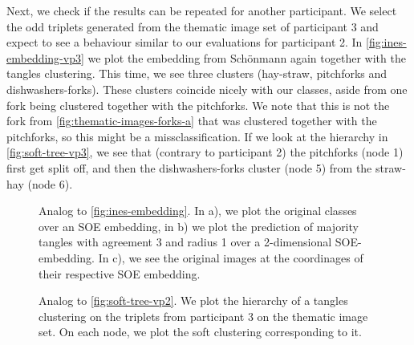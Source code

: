 Next, we check if the results can be repeated for another participant. 
We select the odd triplets generated from the thematic image set of participant 3 and expect to see a behaviour similar to our evaluations for participant 2. 
In \autoref{fig:ines-embedding-vp3} we plot the embedding
from Schönmann again together with the tangles clustering. This time, we see three clusters (hay-straw, pitchforks and dishwashers-forks). These clusters coincide nicely
with our classes, aside from one fork being clustered together with the pitchforks. We note that this is not the fork from \autoref{fig:thematic-images-forks-a} that was clustered together 
with the pitchforks, so this might be a missclassification. 
If we look at the hierarchy in \autoref{fig:soft-tree-vp3}, we see that (contrary to participant 2) the pitchforks (node 1) first get split off, 
and then the dishwashers-forks cluster (node 5) from the straw-hay (node 6).

\onecolumn
\begin{figure}[ht]
    \centering
    \hfill
    \caption{
        Analog to \autoref{fig:ines-embedding}. In a), we plot the original classes over an SOE embedding, in b) we plot the prediction of majority tangles with agreement 3 and radius 1 over 
        a 2-dimensional SOE-embedding. In c), we see the original images at the coordinages of their respective SOE embedding.
    }
    \label{fig:ines-embedding-vp3}
\end{figure}

\onecolumn
\begin{figure}[ht]
    \centering
    \caption{
        Analog to \autoref{fig:soft-tree-vp2}. We plot the hierarchy of a tangles clustering on the triplets from participant 3 on the thematic image set. 
        On each node, we plot the soft clustering corresponding to it.
    }
    \label{fig:soft-tree-vp3}
\end{figure}


